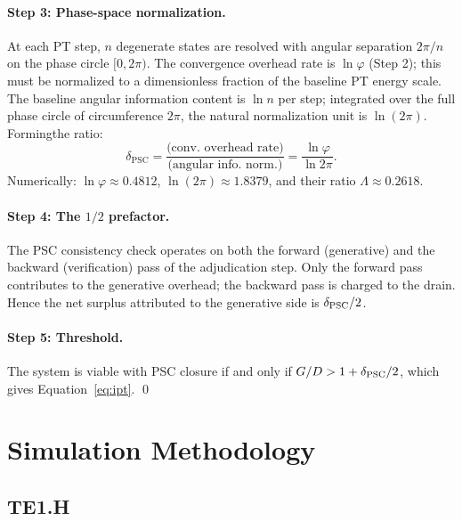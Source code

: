 \documentclass[11pt,twocolumn]{article}
\theoremstyle{remark}
\begin{document}
\paragraph{Step 3: Phase-space normalization.}
At each PT step, $n$ degenerate states are resolved with angular separation
$2\pi/n$ on the phase circle $[0,2\pi)$. The convergence overhead rate is
$\ln\varphi$ (Step 2); this must be normalized to a dimensionless fraction
of the baseline PT energy scale. The baseline angular information content is
$\ln n$ per step; integrated over the full phase circle of circumference
$2\pi$, the natural normalization unit is $\ln(2\pi)$. Forming\linebreak[0] the ratio:
\[
  \delta_{\mathrm{PSC}}
  = \frac{\text{(conv.\ overhead rate)}}
         {\text{(angular info.\ norm.)}}
  = \frac{\ln\varphi}{\ln 2\pi}.
\]
Numerically: $\ln\varphi \approx 0.4812$, $\ln(2\pi) \approx 1.8379$,
and their ratio $\Lambda \approx 0.2618$.

\paragraph{Step 4: The $1/2$ prefactor.}
The PSC consistency check operates on both the forward (generative)
and the backward (verification) pass of the adjudication step.
Only the forward pass contributes to the generative overhead;
the backward pass is charged to the drain. Hence the net surplus
attributed to the generative side is $\delta_{\rm PSC}/2$.

\paragraph{Step 5: Threshold.}
The system is viable with PSC closure if and only if $G/D > 1 +
\delta_{\rm PSC}/2$, which gives Equation~\eqref{eq:ipt}. \qed

\section{Simulation Methodology}
\label{app:simulation}

\subsection{TE1.H}
\label{app:sim:te1h}
\end{document}
